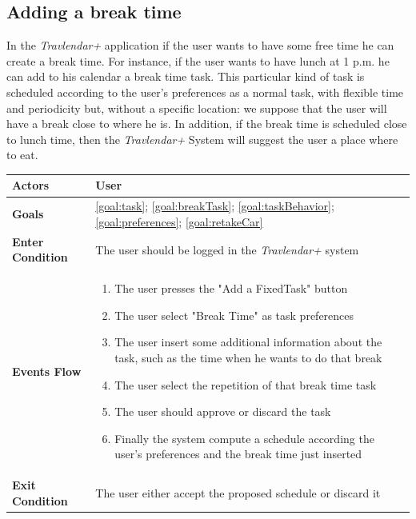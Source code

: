 \subsection{Adding a break time}
In the \emph{Travlendar+} application if the user wants to have some free time he can create a break time. For instance, if the user wants to have lunch at 1 p.m. he can add to his calendar a break time task. This particular kind of task is scheduled according to the user's preferences as a normal task, with flexible time and periodicity but, without a specific location: we suppose that the user will have a break close to where he is.
In addition, if the break time is scheduled close to lunch time, then the \emph{Travlendar+} System will suggest the user a place where to eat.


\begin{table}[H]
	\centering
    
    \begin{tabular}{|p{3.5cm}|p{10.3cm}|}
    
    \hline
    \textbf{\large{Actors}}  			& \tabitem User\\
    
    \hline
    \textbf{\large{Goals}} 				& \ref{goal:task}; \ref{goal:breakTask}; \ref{goal:taskBehavior}; \ref{goal:preferences}; \ref{goal:retakeCar}\\
    
    \hline
    \textbf{\large{Enter Condition}}	& The user should be logged in the                                                        \emph{Travlendar+} system\\
    
    \hline
    \textbf{\large{Events Flow}}		& \begin{enumerate}[leftmargin=0.5cm]
                                          	\item The user presses the "Add a FixedTask" button
                                          	\item The user select "Break Time" as task preferences
                                          	\item The user insert some additional information about the task, such as the time when he wants to do that break
                                          	\item The user select the repetition of that break time task
                                          	\item The user should approve or discard the task
                                          	\item Finally the system compute a schedule according the user's preferences and the break time just inserted
                                          \end{enumerate}
    										\\
    \hline
    \textbf{\large{Exit Condition}} 	& The user either accept the proposed schedule or discard it\\
    

\end{tabular}
\end{table}
